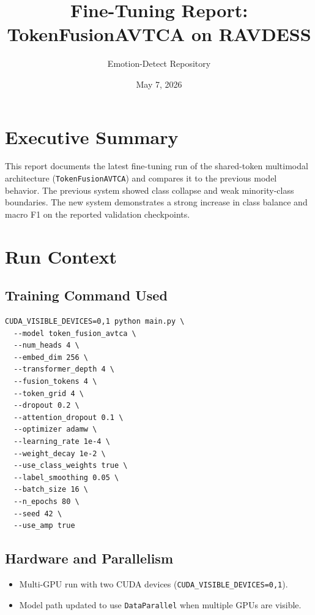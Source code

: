 \documentclass[11pt]{article}
\title{Fine-Tuning Report: TokenFusionAVTCA on RAVDESS}
\author{Emotion-Detect Repository}
\date{May 7, 2026}
\begin{document}
\maketitle

\section{Executive Summary}
This report documents the latest fine-tuning run of the shared-token multimodal architecture (\texttt{TokenFusionAVTCA}) and compares it to the previous model behavior. The previous system showed class collapse and weak minority-class boundaries. The new system demonstrates a strong increase in class balance and macro F1 on the reported validation checkpoints.

\section{Run Context}
\subsection{Training Command Used}
\begin{verbatim}
CUDA_VISIBLE_DEVICES=0,1 python main.py \
  --model token_fusion_avtca \
  --num_heads 4 \
  --embed_dim 256 \
  --transformer_depth 4 \
  --fusion_tokens 4 \
  --token_grid 4 \
  --dropout 0.2 \
  --attention_dropout 0.1 \
  --optimizer adamw \
  --learning_rate 1e-4 \
  --weight_decay 1e-2 \
  --use_class_weights true \
  --label_smoothing 0.05 \
  --batch_size 16 \
  --n_epochs 80 \
  --seed 42 \
  --use_amp true
\end{verbatim}

\subsection{Hardware and Parallelism}
\begin{itemize}
  \item Multi-GPU run with two CUDA devices (\texttt{CUDA\_VISIBLE\_DEVICES=0,1}).
  \item Model path updated to use \texttt{DataParallel} when multiple GPUs are visible.
\end{itemize}
\end{document}

